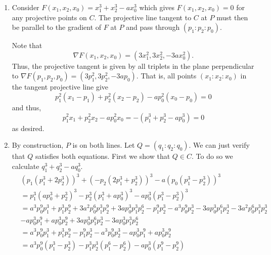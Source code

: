 \documentclass[12 pt, letterpaper]{hmcpset}
\begin{document}
\begin{solution}
	\begin{enumerate}
		\item Consider $F(x_{1}, x_{2}, x_{0}) = x_{1}^{3} + x_{2}^{3} - a x_{0}^{3}$ which gives $F(x_{1}, x_{2}, x_{0}) = 0$ for any projective points on $C$. The projective line tangent to $C$ at $P$ must then be parallel to the gradient of $F$ at $P$ and pass through $(p_{1} : p_{2} : p_{0})$.

			Note that
			\[
				\nabla F (x_{1}, x_{2}, x_{0}) = (3 x_{1}^{2}, 3 x_{2}^{2}, - 3 a x_{0}^{2}).
			\]
			Thus, the projective tangent is given by all triplets in the plane perpendicular to $\nabla F(p_{1}, p_{2}, p_{0}) = (3 p_{1}^{2}, 3 p_{2}^{2}, - 3 a p_{0})$. That is, all points $(x_{1} : x_{2} : x_{0})$ in the tangent projective line give
			\[
				p_{1}^{2} (x_{1} - p_{1}) + p_{2}^{2} (x_{2} - p_{2}) - a p_{0}^{2} (x_{0} - p_{0}) = 0
			\]
			and thus,
			\[
				p_{1}^{2} x_{1} + p_{2}^{2} x_{2} - a p_{0}^{2} x_{0} = - (p_{1}^{3} + p_{2}^{3} - a p_{0}^{3}) = 0
			\]
			as desired.
		\item By construction, $P$ is on both lines. Let $Q = (q_{1} : q_{2} : q_{0})$. We can just verify that $Q$ satisfies both equations. First we show that $Q \in C$. To do so we calculate $q_{1}^{3} + q_{2}^{3} - a q_{0}^{3}$.
			\[
				\begin{split}
					& (p_{1}(p_{1}^{3} + 2 p_{2}^{3}))^{3} + (-p_{2}(2 p_{1}^{3} + p_{2}^{3}))^{3} - a (p_{0}(p_{1}^{3} - p_{2}^{3}))^{3} \\
					& = p_{1}^{3} (a p_{0}^{3} + p_{2}^{3})^{3} - p_{2}^{3} (p_{1}^{3} + a p_{0}^{3})^{3} - a p_{0}^{3} (p_{1}^{3} - p_{2}^{3})^{3} \\
					& = a^{3} p_{0}^{9} p_{1}^{3} + p_{1}^{3} p_{2}^{9} + 3 a^{2} p_{0}^{6} p_{1}^{3} p_{2}^{9} + 3 a p_{0}^{3} p_{1}^{3} p_{2}^{6} - p_{1}^{9} p_{2}^{3} - a^{3} p_{0}^{9} p_{2}^{3} - 3 a p_{0}^{3} p_{1}^{6} p_{2}^{3} - 3 a^{2} p_{0}^{6} p_{1}^{3} p_{2}^{3} \\
					& - a p_{0}^{3} p_{1}^{9} + a p_{0}^{3} p_{2}^{9} + 3 a p_{0}^{3}p_{1}^{6} p_{2}^{3} - 3 ap_{0}^{3} p_{1}^{3} p_{2}^{6} \\
					& = a^{3} p_{0}^{9} p_{1}^{3} + p_{1}^{3} p_{2}^{9} - p_{1}^{9} p_{2}^{3} - a^{3} p_{0}^{9} p_{2}^{3} - a p_{0}^{3} p_{1}^{9} + a p_{0}^{3} p_{2}^{9} \\
					& = a^{3} p_{0}^{9} (p_{1}^{3} - p_{2}^{3}) - p_{1}^{3} p_{2}^{3}(p_{1}^{6} - p_{2}^{6}) - a p_{0}^{3}(p_{1}^{9} - p_{2}^{9}) \\

\end{split}\]
\end{enumerate}
\end{solution}
\end{document}
